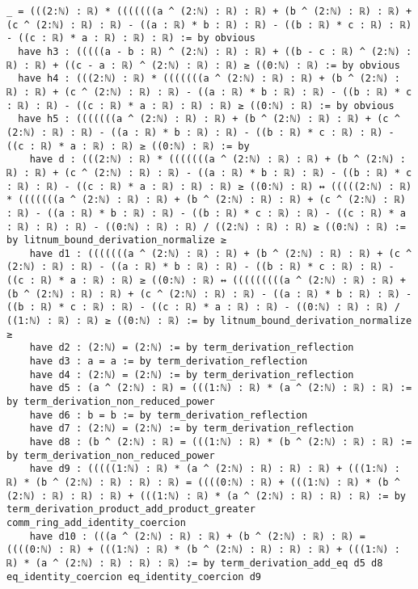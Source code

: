 \documentclass{article}
\begin{document}
\begin{tcolorbox}[colback=white!10, width=\linewidth]
\begin{lstlisting}[language=Lean4]
    _ = (((2:ℕ) : ℝ) * (((((((a ^ (2:ℕ) : ℝ) : ℝ) + (b ^ (2:ℕ) : ℝ) : ℝ) + (c ^ (2:ℕ) : ℝ) : ℝ) - ((a : ℝ) * b : ℝ) : ℝ) - ((b : ℝ) * c : ℝ) : ℝ) - ((c : ℝ) * a : ℝ) : ℝ) : ℝ) := by obvious
  have h3 : (((((a - b : ℝ) ^ (2:ℕ) : ℝ) : ℝ) + ((b - c : ℝ) ^ (2:ℕ) : ℝ) : ℝ) + ((c - a : ℝ) ^ (2:ℕ) : ℝ) : ℝ) ≥ ((0:ℕ) : ℝ) := by obvious
  have h4 : (((2:ℕ) : ℝ) * (((((((a ^ (2:ℕ) : ℝ) : ℝ) + (b ^ (2:ℕ) : ℝ) : ℝ) + (c ^ (2:ℕ) : ℝ) : ℝ) - ((a : ℝ) * b : ℝ) : ℝ) - ((b : ℝ) * c : ℝ) : ℝ) - ((c : ℝ) * a : ℝ) : ℝ) : ℝ) ≥ ((0:ℕ) : ℝ) := by obvious
  have h5 : (((((((a ^ (2:ℕ) : ℝ) : ℝ) + (b ^ (2:ℕ) : ℝ) : ℝ) + (c ^ (2:ℕ) : ℝ) : ℝ) - ((a : ℝ) * b : ℝ) : ℝ) - ((b : ℝ) * c : ℝ) : ℝ) - ((c : ℝ) * a : ℝ) : ℝ) ≥ ((0:ℕ) : ℝ) := by
    have d : (((2:ℕ) : ℝ) * (((((((a ^ (2:ℕ) : ℝ) : ℝ) + (b ^ (2:ℕ) : ℝ) : ℝ) + (c ^ (2:ℕ) : ℝ) : ℝ) - ((a : ℝ) * b : ℝ) : ℝ) - ((b : ℝ) * c : ℝ) : ℝ) - ((c : ℝ) * a : ℝ) : ℝ) : ℝ) ≥ ((0:ℕ) : ℝ) ↔ (((((2:ℕ) : ℝ) * (((((((a ^ (2:ℕ) : ℝ) : ℝ) + (b ^ (2:ℕ) : ℝ) : ℝ) + (c ^ (2:ℕ) : ℝ) : ℝ) - ((a : ℝ) * b : ℝ) : ℝ) - ((b : ℝ) * c : ℝ) : ℝ) - ((c : ℝ) * a : ℝ) : ℝ) : ℝ) - ((0:ℕ) : ℝ) : ℝ) / ((2:ℕ) : ℝ) : ℝ) ≥ ((0:ℕ) : ℝ) := by litnum_bound_derivation_normalize ≥
    have d1 : (((((((a ^ (2:ℕ) : ℝ) : ℝ) + (b ^ (2:ℕ) : ℝ) : ℝ) + (c ^ (2:ℕ) : ℝ) : ℝ) - ((a : ℝ) * b : ℝ) : ℝ) - ((b : ℝ) * c : ℝ) : ℝ) - ((c : ℝ) * a : ℝ) : ℝ) ≥ ((0:ℕ) : ℝ) ↔ (((((((((a ^ (2:ℕ) : ℝ) : ℝ) + (b ^ (2:ℕ) : ℝ) : ℝ) + (c ^ (2:ℕ) : ℝ) : ℝ) - ((a : ℝ) * b : ℝ) : ℝ) - ((b : ℝ) * c : ℝ) : ℝ) - ((c : ℝ) * a : ℝ) : ℝ) - ((0:ℕ) : ℝ) : ℝ) / ((1:ℕ) : ℝ) : ℝ) ≥ ((0:ℕ) : ℝ) := by litnum_bound_derivation_normalize ≥
    have d2 : (2:ℕ) = (2:ℕ) := by term_derivation_reflection
    have d3 : a = a := by term_derivation_reflection
    have d4 : (2:ℕ) = (2:ℕ) := by term_derivation_reflection
    have d5 : (a ^ (2:ℕ) : ℝ) = (((1:ℕ) : ℝ) * (a ^ (2:ℕ) : ℝ) : ℝ) := by term_derivation_non_reduced_power
    have d6 : b = b := by term_derivation_reflection
    have d7 : (2:ℕ) = (2:ℕ) := by term_derivation_reflection
    have d8 : (b ^ (2:ℕ) : ℝ) = (((1:ℕ) : ℝ) * (b ^ (2:ℕ) : ℝ) : ℝ) := by term_derivation_non_reduced_power
    have d9 : (((((1:ℕ) : ℝ) * (a ^ (2:ℕ) : ℝ) : ℝ) : ℝ) + (((1:ℕ) : ℝ) * (b ^ (2:ℕ) : ℝ) : ℝ) : ℝ) = ((((0:ℕ) : ℝ) + (((1:ℕ) : ℝ) * (b ^ (2:ℕ) : ℝ) : ℝ) : ℝ) + (((1:ℕ) : ℝ) * (a ^ (2:ℕ) : ℝ) : ℝ) : ℝ) := by term_derivation_product_add_product_greater comm_ring_add_identity_coercion
    have d10 : (((a ^ (2:ℕ) : ℝ) : ℝ) + (b ^ (2:ℕ) : ℝ) : ℝ) = ((((0:ℕ) : ℝ) + (((1:ℕ) : ℝ) * (b ^ (2:ℕ) : ℝ) : ℝ) : ℝ) + (((1:ℕ) : ℝ) * (a ^ (2:ℕ) : ℝ) : ℝ) : ℝ) := by term_derivation_add_eq d5 d8 eq_identity_coercion eq_identity_coercion d9

\end{lstlisting}
\end{tcolorbox}
\end{document}
